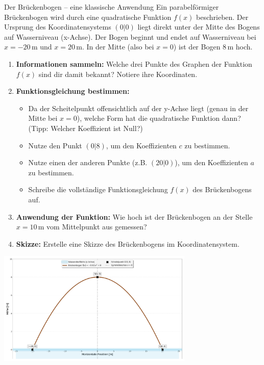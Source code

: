 \begin{aufgabenumgebung}[Brückenbogen]{Der Brückenbogen – eine klassische Anwendung}
Ein parabelförmiger Brückenbogen wird durch eine quadratische Funktion $f(x)$ beschrieben. Der Ursprung des Koordinatensystems $(0|0)$ liegt direkt unter der Mitte des Bogens auf Wasserniveau (x-Achse).
Der Bogen beginnt und endet auf Wasserniveau bei $x=-20\,$m und $x=20\,$m. In der Mitte (also bei $x=0$) ist der Bogen $8\,$m hoch.
\begin{enumerate}
    \item \textbf{Informationen sammeln:} Welche drei Punkte des Graphen der Funktion $f(x)$ sind dir damit bekannt? Notiere ihre Koordinaten.
    \item \textbf{Funktionsgleichung bestimmen:}
        \begin{itemize}
            \item Da der Scheitelpunkt offensichtlich auf der y-Achse liegt (genau in der Mitte bei $x=0$), welche Form hat die quadratische Funktion dann? (Tipp: Welcher Koeffizient ist Null?)
            \item Nutze den Punkt $(0|8)$, um den Koeffizienten $c$ zu bestimmen.
            \item Nutze einen der anderen Punkte (z.B. $(20|0)$), um den Koeffizienten $a$ zu bestimmen.
            \item Schreibe die vollständige Funktionsgleichung $f(x)$ des Brückenbogens auf.
        \end{itemize}
    \item \textbf{Anwendung der Funktion:} Wie hoch ist der Brückenbogen an der Stelle $x=10\,$m vom Mittelpunkt aus gemessen?
    \item \textbf{Skizze:} Erstelle eine Skizze des Brückenbogens im Koordinatensystem.
\end{enumerate}
\begin{center}
    \includegraphics[width=0.7\textwidth]{grafiken/Brueckenbogen_Parabel.png}
    \label{fig:brueckenbogen}
\end{center}
\end{aufgabenumgebung}

